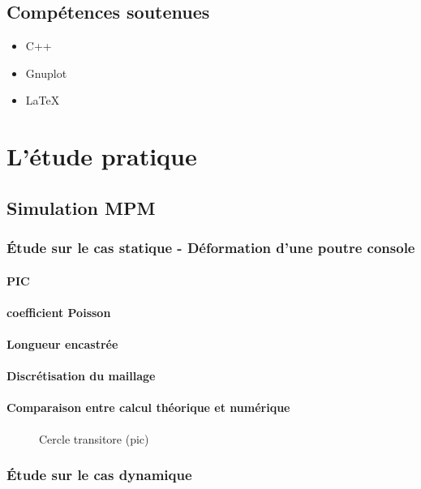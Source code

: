 \documentclass[a4paper,12pt]{report}
\begin{document}
\section{Compétences soutenues}
\begin{itemize}
      \item C++
      \item Gnuplot
      \item LaTeX
\end{itemize}


\chapter{L'étude pratique}
\section{Simulation MPM}
\subsection{Étude sur le cas statique - Déformation d'une poutre console}
\subsubsection{PIC}
\subsubsection{coefficient Poisson}
\subsubsection{Longueur encastrée}
\subsubsection{Discrétisation du maillage}
\subsubsection{Comparaison entre calcul théorique et numérique}
                                \begin{figure}
                                    \centering
                                    \scalebox{0.5}{}
                                    \caption{Cercle transitore (pic)}
                                \end{figure}
\subsection{Étude sur le cas dynamique}
\end{document}
